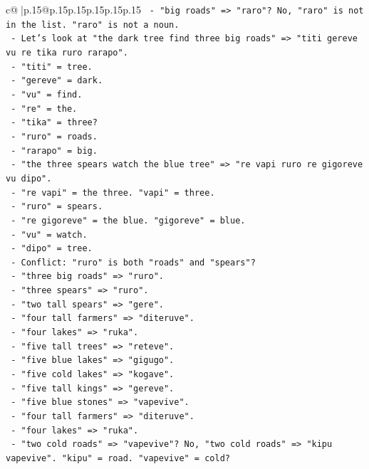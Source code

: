 \documentclass{article}
\begin{document}
{\begin{supertabular}{c@{$\;$}|p{.15\linewidth}@{}p{.15\linewidth}p{.15\linewidth}p{.15\linewidth}p{.15\linewidth}p{.15\linewidth}}
{{{\texttt{  {-} "big roads" => "raro"? No, "raro" is not in the list. "raro" is not a noun.} \\
\texttt{  {-} Let's look at "the dark tree find three big roads" => "titi gereve vu re tika ruro rarapo".} \\
\texttt{    {-} "titi" = tree.} \\
\texttt{    {-} "gereve" = dark.} \\
\texttt{    {-} "vu" = find.} \\
\texttt{    {-} "re" = the.} \\
\texttt{    {-} "tika" = three?} \\
\texttt{    {-} "ruro" = roads.} \\
\texttt{    {-} "rarapo" = big.} \\
\texttt{  {-} "the three spears watch the blue tree" => "re vapi ruro re gigoreve vu dipo".} \\
\texttt{    {-} "re vapi" = the three. "vapi" = three.} \\
\texttt{    {-} "ruro" = spears.} \\
\texttt{    {-} "re gigoreve" = the blue. "gigoreve" = blue.} \\
\texttt{    {-} "vu" = watch.} \\
\texttt{    {-} "dipo" = tree.} \\
\texttt{  {-} Conflict: "ruro" is both "roads" and "spears"?} \\
\texttt{    {-} "three big roads" => "ruro".} \\
\texttt{    {-} "three spears" => "ruro".} \\
\texttt{    {-} "two tall spears" => "gere".} \\
\texttt{    {-} "four tall farmers" => "diteruve".} \\
\texttt{    {-} "four lakes" => "ruka".} \\
\texttt{    {-} "five tall trees" => "reteve".} \\
\texttt{    {-} "five blue lakes" => "gigugo".} \\
\texttt{    {-} "five cold lakes" => "kogave".} \\
\texttt{    {-} "five tall kings" => "gereve".} \\
\texttt{    {-} "five blue stones" => "vapevive".} \\
\texttt{    {-} "four tall farmers" => "diteruve".} \\
\texttt{    {-} "four lakes" => "ruka".} \\
\texttt{    {-} "two cold roads" => "vapevive"? No, "two cold roads" => "kipu vapevive". "kipu" = road. "vapevive" = cold?} \\
}}}
\end{supertabular}}
\end{document}

